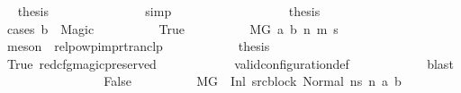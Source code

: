 \begin{isabellebody}
\ \isamarkupfalse%
\ {\isacharquery}{\kern0pt}thesis\ \isanewline
\ \ \ \ \ \ \ \ \ \ \ \ \isamarkupfalse%
\ simp\isanewline
\ \ \ \ \ \ \ \ \isamarkupfalse%
\isanewline
\ \ \ \ \ \ \isamarkupfalse%
\ \isamarkupfalse%
\ {\isacharquery}{\kern0pt}thesis\isanewline
\ \ \ \ \ \ \isamarkupfalse%
\ {\isacharparenleft}{\kern0pt}cases\ {\isachardoublequoteopen}b\ {\isacharequal}{\kern0pt}\ Magic{\isachardoublequoteclose}{\isacharparenright}{\kern0pt}\isanewline
\ \ \ \ \ \ \ \ \isamarkupfalse%
\ True\isanewline
\ \ \ \ \ \ \ \ \isamarkupfalse%
\ {\isachardoublequoteopen}M{\isacharcomma}{\kern0pt}{\isasymLambda}{\isacharcomma}{\kern0pt}{\isasymGamma}{\isacharcomma}{\kern0pt}{\isasymOmega}{\isacharcomma}{\kern0pt}G\ {\isasymturnstile}{\isacharparenleft}{\kern0pt}a{\isacharcomma}{\kern0pt}\ b{\isacharparenright}{\kern0pt}\ {\isacharminus}{\kern0pt}n{\isasymrightarrow}{\isacharasterisk}{\kern0pt}\ {\isacharparenleft}{\kern0pt}m{\isacharprime}{\kern0pt}{\isacharcomma}{\kern0pt}\ s{\isacharprime}{\kern0pt}{\isacharparenright}{\kern0pt}{\isachardoublequoteclose}\isanewline
\ \ \ \ \ \ \ \ \ \ \isamarkupfalse%
\ {\isacharparenleft}{\kern0pt}meson\ {\isachardoublequoteopen}{}{\isachardoublequoteclose}{\isacharparenleft}{\kern0pt}{}{\isacharparenright}{\kern0pt}\ relpowp{\isacharunderscore}{\kern0pt}imp{\isacharunderscore}{\kern0pt}rtranclp{\isacharparenright}{\kern0pt}\isanewline
\ \ \ \ \ \ \ \ \isamarkupfalse%
\ \isamarkupfalse%
\ {\isacharquery}{\kern0pt}thesis\isanewline
\ \ \ \ \ \ \ \ \ \ \isamarkupfalse%
\ True\ red{\isacharunderscore}{\kern0pt}cfg{\isacharunderscore}{\kern0pt}magic{\isacharunderscore}{\kern0pt}preserved\isanewline
\ \ \ \ \ \ \ \ \ \ \isamarkupfalse%
\ valid{\isacharunderscore}{\kern0pt}configuration{\isacharunderscore}{\kern0pt}def\isanewline
\ \ \ \ \ \ \ \ \ \ \isamarkupfalse%
\ blast\isanewline
\ \ \ \ \ \ \isamarkupfalse%
\isanewline
\ \ \ \ \ \ \ \ \isamarkupfalse%
\ False\isanewline
\ \ \ \ \ \ \ \ \isamarkupfalse%
\ {\isacartoucheopen}M{\isacharcomma}{\kern0pt}{\isasymLambda}{\isacharcomma}{\kern0pt}{\isasymGamma}{\isacharcomma}{\kern0pt}{\isasymOmega}{\isacharcomma}{\kern0pt}G\ {\isasymturnstile}\ {\isacharparenleft}{\kern0pt}Inl\ src{\isacharunderscore}{\kern0pt}block{\isacharcomma}{\kern0pt}\ Normal\ ns{\isacharparenright}{\kern0pt}\ {\isacharminus}{\kern0pt}n{\isasymrightarrow}\ {\isacharparenleft}{\kern0pt}a{\isacharcomma}{\kern0pt}\ b{\isacharparenright}{\kern0pt}{\isacartoucheclose}\ \isamarkupfalse%

\end{isabellebody}
